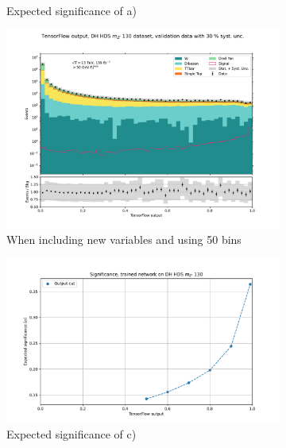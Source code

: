 \documentclass[14pt, a4paper]{book}
\begin{document}
\begin{figure}[!ht]
\begin{subfigure}[b]{0.49\textwidth}
      \caption{Expected significance of a)}
   \end{subfigure}
   \hfill
   \begin{subfigure}[b]{0.49\textwidth}
      \centering
      \includegraphics[width=1\textwidth]{new_variables/VAL.pdf}
      \caption{When including new variables and using 50 bins}
   \end{subfigure}
   \hfill
   \begin{subfigure}[b]{0.49\textwidth}
      \centering
      \includegraphics[width=1\textwidth]{new_variables/EXP_SIG.pdf}
      \caption{Expected significance of c)}
   \end{subfigure}
   \hfill
	\begin{subfigure}[b]{0.49\textwidth}
      \centering

\end{subfigure}
\end{figure}
\end{document}

